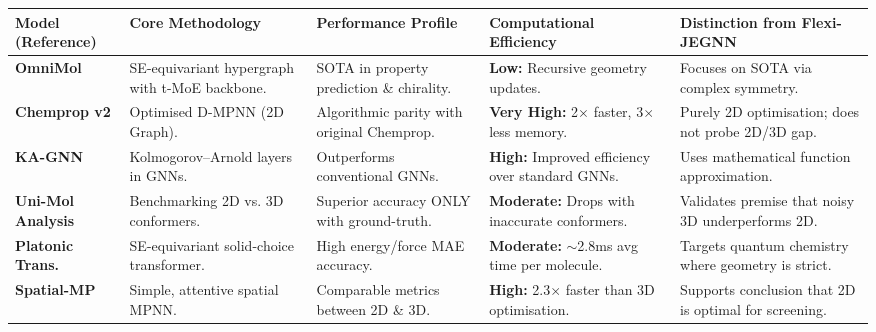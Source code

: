 \documentclass[pdflatex,sn-vancouver-num]{sn-jnl}%
\theoremstyle{thmstyleone}%
\theoremstyle{thmstyletwo}%
\theoremstyle{thmstylethree}%
\renewenvironment{table}[1][htbp]%
{\begin{tableorg}[#1]%
\begin{center}
\begin{adjustbox}{max width=\linewidth}
\begin{threeparttable}
\tablebodyfont%
\renewcommand\footnotetext[2][]{{\removelastskip\vskip3pt%
\let\tablebodyfont\tablefootnotefont%
\hskip0pt\if!##1!\else{\smash{$^{##1}$}}\fi##2\par}}%
}{\end{threeparttable}\end{adjustbox}\end{center}\end{tableorg}}
\begin{document}
\begin{table}[htbp]
  \centering
  \caption{Comparative analysis of recent molecular representation architectures and their distinction from the proposed Flexi-JEGNN framework.}
  \label{tab:lit_comparison}
  \renewcommand{\arraystretch}{1.1} 
  \setlength{\tabcolsep}{4pt}
  \scriptsize 
  \begin{tabular}{|p{}|p{}|p{}|p{}|p{}|}
    \hline
    \textbf{Model (Reference)} & \textbf{Core Methodology} & \textbf{Performance Profile} & \textbf{Computational Efficiency} & \textbf{Distinction from Flexi-JEGNN} \\
    \hline
    
    \textbf{OmniMol} \cite{wang2025omnimol} & SE-equivariant hypergraph with t-MoE backbone. & SOTA in property prediction \& chirality. & \textbf{Low:} Recursive geometry updates. & Focuses on SOTA via complex symmetry. \\
    \hline
    
    \textbf{Chemprop v2} \cite{graff2026chempropv2} & Optimised D-MPNN (2D Graph). & Algorithmic parity with original Chemprop. & \textbf{Very High:} 2$\times$ faster, 3$\times$ less memory. & Purely 2D optimisation; does not probe 2D/3D gap. \\
    \hline
    
    \textbf{KA-GNN} \cite{kangnn2025} & Kolmogorov--Arnold layers in GNNs. & Outperforms conventional GNNs. & \textbf{High:} Improved efficiency over standard GNNs. & Uses mathematical function approximation. \\
    \hline
    
    \textbf{Uni-Mol Analysis} \cite{hamakawa2025conformation} & Benchmarking 2D vs. 3D conformers. & Superior accuracy ONLY with ground-truth. & \textbf{Moderate:} Drops with inaccurate conformers. & Validates premise that noisy 3D underperforms 2D. \\
    \hline
    
    \textbf{Platonic Trans.} \cite{islam2025platonictransformerssolidchoice} & SE-equivariant solid-choice transformer. & High energy/force MAE accuracy. & \textbf{Moderate:} $\sim$2.8ms avg time per molecule. & Targets quantum chemistry where geometry is strict. \\
    \hline
    
    \textbf{Spatial-MP} \cite{Castaneda_Leautaud_2025} & Simple, attentive spatial MPNN. & Comparable metrics between 2D \& 3D. & \textbf{High:} 2.3$\times$ faster than 3D optimisation. & Supports conclusion that 2D is optimal for screening. \\
    \hline
    

\end{tabular}
\end{table}
\end{document}
